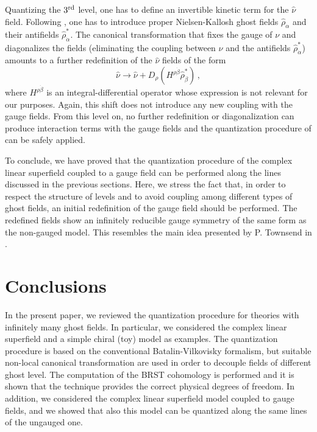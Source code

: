 \documentclass[a4paper,12pt]{article}
\begin{document}
Quantizing the $3^{\rm rd}$ level, one has to define an invertible
kinetic term for the $\hat \nu$ field.
Following \cite{GPZ}, one has to introduce proper Nielsen-Kallosh
ghost fields $\hat \rho_\alpha$ and their antifields $\hat
\rho^*_{\dot\alpha}$. The canonical transformation that fixes the
gauge of $\nu$ and diagonalizes the fields (eliminating the
coupling between $\hat \nu$ and the antifields $\hat
\rho^*_{\dot\alpha}$) amounts to a further redefinition of the $\hat
\nu$ fields of the form
\begin{equation}
  \label{gau_7}
\hat\nu \longrightarrow \hat\nu  + D_\rho \left( H^{\rho \dot\beta} \hat
  \rho^*_{\dot\beta} \right)\,,  
\end{equation}
where $H^{\rho\dot\beta}$ is an integral-differential operator whose
expression is not relevant for our purposes. Again, this shift does
not introduce any new coupling with the gauge fields. From this level
on, no further redefinition or diagonalization can produce interaction
terms with the gauge fields and the quantization procedure of
\cite{GPZ} can be safely applied.

To conclude, we have proved that the quantization procedure of the complex
linear superfield coupled to a gauge field can be performed along the lines
discussed in the previous sections. Here, we stress the fact that, in
order to respect the structure of levels and to avoid coupling among
different types of ghost fields, an initial redefinition of the gauge
field should be performed. The redefined fields show an infinitely 
reducible gauge symmetry of the same form as the non-gauged model. This
resembles the main idea presented by P. Townsend in \cite{3lectures}.


\section{Conclusions}
\label{conclusion}

In the present paper, we reviewed the quantization procedure for
theories with infinitely many ghost fields. In particular, we
considered the complex linear superfield and a simple chiral (toy)
model as examples. The quantization procedure is based on the
conventional Batalin-Vilkovisky formalism, but suitable non-local
canonical transformation are used in order to decouple fields of
different ghost level. The computation of the BRST cohomology
is performed and it is shown that the technique provides the correct
physical degrees of freedom. 
In addition, we considered the complex linear superfield model 
coupled to gauge fields, and we showed that also this model 
can be quantized along the same lines of the ungauged one. 
\end{document}
